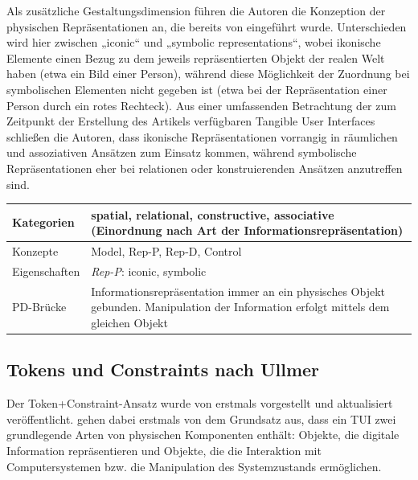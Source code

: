 Als zusätzliche Gestaltungsdimension führen die Autoren die Konzeption der physischen Repräsentationen an, die bereits von \citet{Ullmer97} eingeführt wurde. Unterschieden wird hier zwischen „iconic“ und „symbolic representations“, wobei ikonische Elemente einen Bezug zu dem jeweils repräsentierten Objekt der realen Welt haben (etwa ein Bild einer Person), während diese Möglichkeit der Zuordnung bei symbolischen Elementen nicht gegeben ist (etwa bei der Repräsentation einer Person durch ein rotes Rechteck). Aus einer umfassenden Betrachtung der zum Zeitpunkt der Erstellung des Artikels verfügbaren Tangible User Interfaces schließen die Autoren, dass ikonische Repräsentationen vorrangig in räumlichen und assoziativen Ansätzen zum Einsatz kommen, während symbolische Repräsentationen eher bei relationen oder konstruierenden Ansätzen anzutreffen sind.
\\[1em]
\begin{tabular}{| p{3cm} | p{10cm} |}
  \hline
  Kategorien & spatial, relational, constructive, associative (Einordnung nach Art der Informationsrepräsentation)  \\ \hline
  Konzepte & Model, Rep-P, Rep-D, Control \\ \hline
  Eigenschaften & \emph{Rep-P}: iconic, symbolic \\ \hline
  PD-Brücke & Informationsrepräsentation immer an ein physisches Objekt gebunden. Manipulation der Information erfolgt mittels dem gleichen Objekt \\ \hline
\end{tabular} 


\subsection{Tokens und Constraints nach Ullmer} %
\label{sub:tokens_und_constraints_nach_ullmer}

Der Token+Constraint-Ansatz wurde von \citet{Ullmer02} erstmals vorgestellt und \citet{Ullmer05} aktualisiert veröffentlicht. \citeauthor{Ullmer05} gehen dabei erstmals von dem Grundsatz aus, dass ein \gls{TUI} zwei grundlegende Arten von physischen Komponenten enthält: Objekte, die digitale Information repräsentieren und Objekte, die die Interaktion mit Computersystemen bzw. die Manipulation des Systemzustands ermöglichen.

